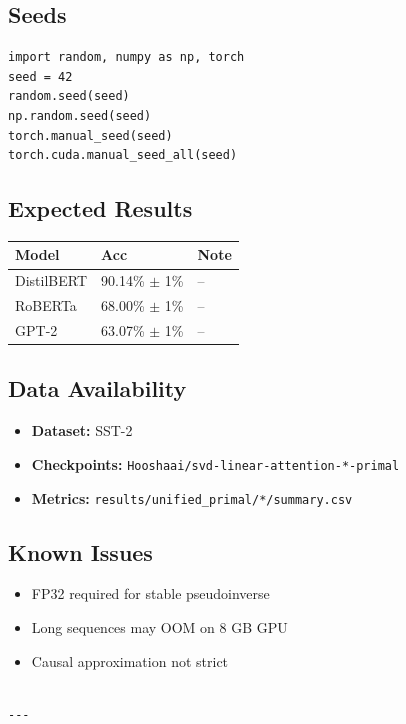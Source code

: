 \subsection{Seeds}

\begin{lstlisting}
import random, numpy as np, torch
seed = 42
random.seed(seed)
np.random.seed(seed)
torch.manual_seed(seed)
torch.cuda.manual_seed_all(seed)
\end{lstlisting}

\subsection{Expected Results}

\begin{table}[H]
\centering
\small
\begin{tabular}{lll}
\toprule
\textbf{Model} & \textbf{Acc} & \textbf{Note} \\
\midrule
DistilBERT & 90.14\% $\pm$ 1\% & -- \\
RoBERTa & 68.00\% $\pm$ 1\% & -- \\
GPT-2 & 63.07\% $\pm$ 1\% & -- \\
\bottomrule
\end{tabular}
\end{table}

\subsection{Data Availability}

\begin{itemize}
\item \textbf{Dataset:} SST-2
\item \textbf{Checkpoints:} \texttt{Hooshaai/svd-linear-attention-*-primal}
\item \textbf{Metrics:} \texttt{results/unified\_primal/*/summary.csv}

\end{itemize}
\subsection{Known Issues}

\begin{itemize}
\item FP32 required for stable pseudoinverse
\item Long sequences may OOM on 8 GB GPU
\item Causal approximation not strict
\end{itemize}
\begin{lstlisting}

---
\end{lstlisting}
